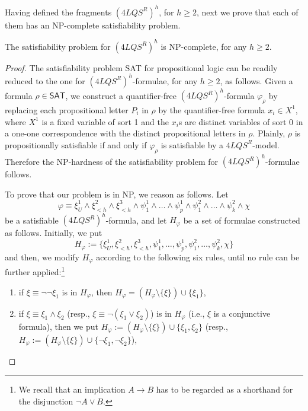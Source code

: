 \documentclass{fundam}
\renewcommand{\And}{\wedge}
\newcommand{\Or}{\vee}
\newcommand{\Hf}{H_{\varphi}}
\newcommand{\QLQSR}{\ensuremath{\mbox{$4\mathit{LQS}^{R}$}}\xspace}
\begin{document}
Having defined the fragments $(\QLQSR)^{h}$, for $h \geq 2$, next we
prove that each of them has an \textsf{NP}-complete satisfiability
problem.
\begin{theorem}
The satisfiability problem for $(\QLQSR)^{h}$ is
\textsf{NP}-complete, for any $h \geq 2$.
\end{theorem}
\begin{proof}
The satisfiability problem \textsf{SAT} for propositional logic can be
readily reduced to the one for $(\QLQSR)^{h}$-formulae, for any $h
\geq 2$, as follows. Given a formula $\rho \in \textsf{SAT}$, we
construct a quantifier-free $(\QLQSR)^{h}$-formula $\varphi_{\rho}$
by replacing each propositional letter $P_{i}$ in $\rho$ by the
quantifier-free formula $x_{i} \in X^{1}$, where $X^{1}$ is a fixed
variable of sort 1 and the $x_{i}$s are distinct variables of sort
0 in a one-one correspondence with the distinct propositional
letters in $\rho$. Plainly, $\rho$ is propositionally satisfiable if
and only if $\varphi_{\rho}$ is satisfiable by a $\QLQSR$-model.
Therefore the \textsf{NP}-hardness of the satisfiability problem for
$(\QLQSR)^{h}$-formulae follows.

To prove that our problem is in \textsf{NP}, we reason as follows.
Let
\begin{equation}
    \label{eq_QLQSR}
    \varphi \equiv \xi_U^1 \And \xi_{< h}^2 \And \xi_{< h}^3 \And \psi_1^1
    \And \ldots \And \psi_p^1 \And \psi_1^2\And \ldots\And \psi_k^2
    \And \chi
\end{equation}
be a satisfiable $(\QLQSR)^{h}$-formula, and let $\Hf$ be a set of
formulae constructed as follows.  Initially, we put
\[
\Hf := \{\xi_U^1, \xi_{< h}^2, \xi_{< h}^3,\psi_1^1,\ldots, \psi_p^1,
\psi_1^2, \ldots, \psi_k^2, \chi\}
\]
and then, we modify $\Hf$ according to the following six rules, until
no rule can be further applied:\footnote{We recall that an
implication $A \rightarrow B$ has to be regarded as a shorthand for
the disjunction $\neg A \vee B$.}
\begin{enumerate}[~~R1:]
\item if $\xi \equiv \neg\neg \xi_1$ is in $\Hf$, then $\Hf = (\Hf
\setminus \{\xi\}) \cup \{\xi_1\}$,

\item if $\xi \equiv \xi_1 \And \xi_2$ (resp., $\xi \equiv \neg (\xi_1
\Or \xi_2)$) is in $\Hf$ (i.e., $\xi$ is a conjunctive formula), then
we put $\Hf := (\Hf \setminus \{\xi\}) \cup \{\xi_1,\xi_2\}$
(resp., $\Hf := (\Hf \setminus \{\xi\}) \cup \{\neg\xi_1,\neg\xi_2\}$),


\end{enumerate}
\end{proof}
\end{document}
